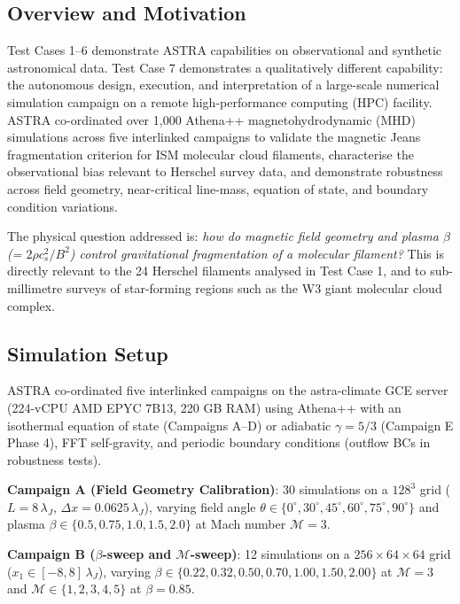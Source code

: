 \documentclass[usenatbib]{rasti}
\begin{document}
\subsection{Overview and Motivation}

Test Cases 1--6 demonstrate ASTRA capabilities on observational and synthetic astronomical data.
Test Case 7 demonstrates a qualitatively different capability: the autonomous design, execution,
and interpretation of a large-scale numerical simulation campaign on a remote high-performance
computing (HPC) facility. ASTRA co-ordinated over 1,000 Athena++ \citep{stone2020} magnetohydrodynamic
(MHD) simulations across five interlinked campaigns to validate the magnetic Jeans fragmentation
criterion for ISM molecular cloud filaments, characterise the observational bias relevant to
Herschel survey data, and demonstrate robustness across field geometry, near-critical
line-mass, equation of state, and boundary condition variations.

The physical question addressed is: \emph{how do magnetic field geometry and plasma
$\beta$ (= $2\rho c_s^2 / B^2$) control gravitational fragmentation of a molecular filament?}
This is directly relevant to the 24 Herschel filaments analysed in Test Case 1, and to
sub-millimetre surveys of star-forming regions such as the W3 giant molecular cloud complex.

\subsection{Simulation Setup}

ASTRA co-ordinated five interlinked campaigns on the astra-climate GCE server (224-vCPU AMD
EPYC 7B13, 220 GB RAM) using Athena++ with an isothermal equation of state (Campaigns A--D)
or adiabatic $\gamma = 5/3$ (Campaign E Phase 4), FFT self-gravity,
and periodic boundary conditions (outflow BCs in robustness tests).

\textbf{Campaign A (Field Geometry Calibration)}: 30 simulations on a $128^3$ grid
($L = 8\,\lambda_J$, $\Delta x = 0.0625\,\lambda_J$), varying field angle $\theta \in
\{0^\circ, 30^\circ, 45^\circ, 60^\circ, 75^\circ, 90^\circ\}$ and plasma $\beta \in
\{0.5, 0.75, 1.0, 1.5, 2.0\}$ at Mach number $\mathcal{M} = 3$.

\textbf{Campaign B ($\beta$-sweep and $\mathcal{M}$-sweep)}: 12 simulations on a
$256 \times 64 \times 64$ grid ($x_1 \in [-8,8]\,\lambda_J$), varying $\beta \in
\{0.22, 0.32, 0.50, 0.70, 1.00, 1.50, 2.00\}$ at $\mathcal{M}=3$ and
$\mathcal{M} \in \{1, 2, 3, 4, 5\}$ at $\beta = 0.85$.
\end{document}

